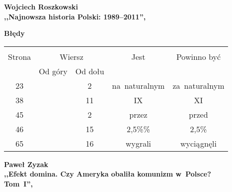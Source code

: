 \documentclass[a4paper,11pt]{article}
\newcommand{\spaceTwo}{2em}
\newcommand{\tb}{\textbf}
\newcommand{\Center}[1]{\begin{center} #1 \end{center}}
\newcommand{\CenterTB}[1]{\Center{\tb{#1}}}
\newcommand{\Work}[1]{ \begin{center} {\large \tb{#1}} \end{center} }
\begin{document}
\vspace{\spaceTwo}





\Work{
  Wojciech Roszkowski \\
  ,,Najnowsza historia Polski: 1989--2011'',
  \cite{RoszkowskiNajnowszaHistoriaPolski89-11Wyd11} }



\CenterTB{Błędy}
\begin{center}
  \begin{tabular}{|c|c|c|c|c|}
    \hline
    & \multicolumn{2}{c|}{} & & \\
    Strona & \multicolumn{2}{c|}{Wiersz}& Jest & Powinno być \\ \cline{2-3}
    & Od góry & Od dołu &  &  \\ \hline
    23 & & 2 & na~naturalnym & za~naturalnym \\
    38 & & 11 & IX & XI \\
    45 & & 2 & przez & przed \\
    46 & & 15 & 2,5\%\% & 2,5\% \\
    65 & & 16 & wygrali & wyciągnęli \\
    \hline
  \end{tabular}
\end{center}

\vspace{\spaceTwo}





\Work{
  Paweł Zyzak \\
  ,,Efekt domina. Czy Ameryka obaliła komunizm w~Polsce? \\
  Tom~I'', \cite{ZyzakEfektDominaTomI16} }


\end{document}

